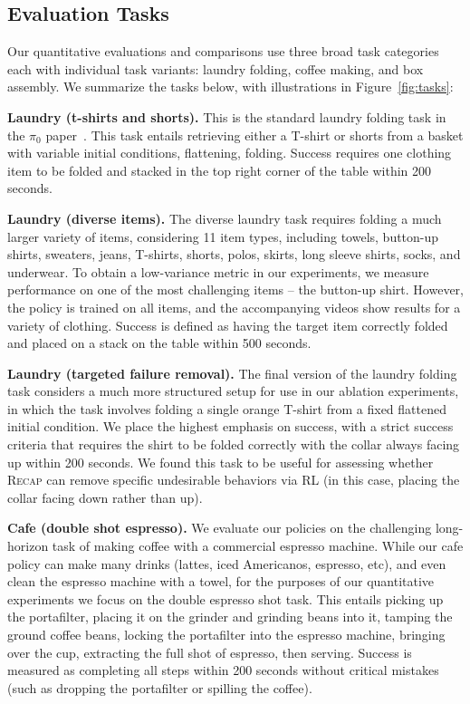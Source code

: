 \documentclass[conference]{IEEEtran}
\def \MethodName {\textsc{Recap}}
\begin{document}
\subsection{Evaluation Tasks}
Our quantitative evaluations and comparisons use three broad task categories each with individual task variants: laundry folding, coffee making, and box assembly. 
We summarize the tasks below, with illustrations in Figure~\ref{fig:tasks}:

\noindent \textbf{Laundry (t-shirts and shorts).} This is the standard laundry folding task in the $\pi_0$ paper~\citep{black2024pi_0}. This task entails retrieving either a T-shirt or shorts from a basket with variable initial conditions, flattening, folding. Success requires one clothing item to be folded and stacked in the top right corner of the table within 200 seconds. 



\noindent \textbf{Laundry (diverse items).} The diverse laundry task requires folding a much larger variety of items, considering 11 item types, including towels, button-up shirts, sweaters, jeans, T-shirts, shorts, polos, skirts, long sleeve shirts, socks, and underwear. To obtain a low-variance metric in our experiments, we measure performance on one of the most challenging items -- the button-up shirt. However, the policy is trained on all items, and the accompanying videos show results for a variety of clothing. Success is defined as having the target item correctly folded and placed on a stack on the table within 500 seconds. 


\noindent \textbf{Laundry (targeted failure removal).} The final version of the laundry folding task considers a much more structured setup for use in our ablation experiments, in which the task involves folding a single orange T-shirt from a fixed flattened initial condition. We place the highest emphasis on success, with a strict success criteria that requires the shirt to be folded correctly with the collar always facing up within 200 seconds. We found this task to be useful for assessing whether \MethodName{} can remove specific undesirable behaviors via RL (in this case, placing the collar facing down rather than up).

\noindent \textbf{Cafe (double shot espresso).} We evaluate our policies on the challenging long-horizon task of making coffee with a commercial espresso machine. While our cafe policy can make many drinks (lattes, iced Americanos, espresso, etc), and even clean the espresso machine with a towel, for the purposes of our quantitative experiments we focus on the double espresso shot task. This entails picking up the portafilter, placing it on the grinder and grinding beans into it, tamping the ground coffee beans, locking the portafilter into the espresso machine, bringing over the cup, extracting the full shot of espresso, then serving. Success is measured as completing all steps within 200 seconds without critical mistakes (such as dropping the portafilter or spilling the coffee).
\end{document}
